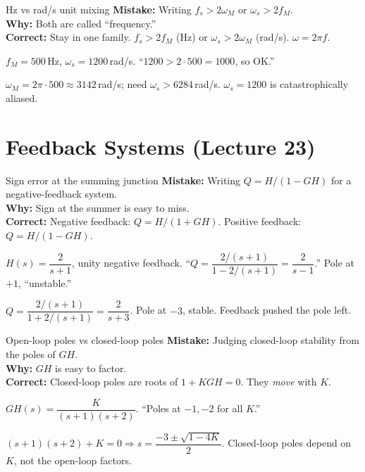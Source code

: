 \documentclass[11pt]{article}
\begin{document}
\begin{pitfallbox}{Hz vs rad/s unit mixing}
\textbf{Mistake:} Writing $f_s > 2\omega_M$ or $\omega_s > 2 f_M$.\\
\textbf{Why:} Both are called ``frequency.''\\
\textbf{Correct:} Stay in one family. $f_s > 2 f_M$ (Hz) or $\omega_s > 2\omega_M$ (rad/s). $\omega = 2\pi f$.
\begin{wrongbox}
$f_M = 500$\,Hz, $\omega_s = 1200$\,rad/s. ``$1200 > 2\cdot 500 = 1000$, so OK.''
\end{wrongbox}
\begin{rightbox}
$\omega_M = 2\pi\cdot 500 \approx 3142$\,rad/s; need $\omega_s > 6284$\,rad/s. $\omega_s = 1200$ is catastrophically aliased.
\end{rightbox}
\end{pitfallbox}

\section{Feedback Systems (Lecture 23)}

\begin{pitfallbox}{Sign error at the summing junction}
\textbf{Mistake:} Writing $Q = H/(1-GH)$ for a negative-feedback system.\\
\textbf{Why:} Sign at the summer is easy to miss.\\
\textbf{Correct:} Negative feedback: $Q = H/(1+GH)$. Positive feedback: $Q = H/(1-GH)$.
\begin{wrongbox}
$H(s) = \dfrac{2}{s+1}$, unity negative feedback. ``$Q = \dfrac{2/(s+1)}{1 - 2/(s+1)} = \dfrac{2}{s-1}$.'' Pole at $+1$, ``unstable.''
\end{wrongbox}
\begin{rightbox}
$Q = \dfrac{2/(s+1)}{1 + 2/(s+1)} = \dfrac{2}{s+3}$. Pole at $-3$, stable. Feedback pushed the pole left.
\end{rightbox}
\end{pitfallbox}

\begin{pitfallbox}{Open-loop poles vs closed-loop poles}
\textbf{Mistake:} Judging closed-loop stability from the poles of $GH$.\\
\textbf{Why:} $GH$ is easy to factor.\\
\textbf{Correct:} Closed-loop poles are roots of $1 + KGH = 0$. They \emph{move} with $K$.
\begin{wrongbox}
$GH(s) = \dfrac{K}{(s+1)(s+2)}$. ``Poles at $-1,-2$ for all $K$.''
\end{wrongbox}
\begin{rightbox}
$(s+1)(s+2) + K = 0 \Rightarrow s = \dfrac{-3\pm\sqrt{1-4K}}{2}$. Closed-loop poles depend on $K$, not the open-loop factors.
\end{rightbox}
\end{pitfallbox}
\end{document}
